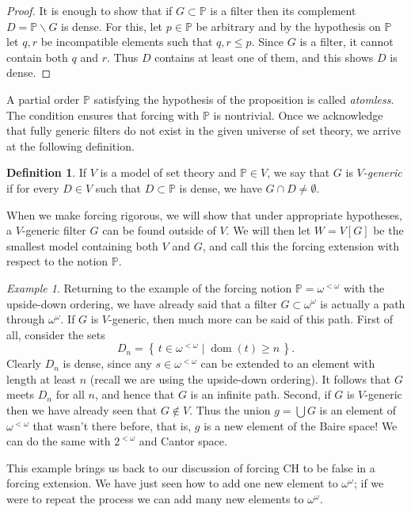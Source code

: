 \documentclass[11pt,oneside]{amsbook}
\newcommand{\set}[1]{\left\{\,#1\,\right\}}
\newcommand{\PP}{\mathbb P}
\DeclareMathOperator{\dom}{dom}
\theoremstyle{definition}
\theoremstyle{plain}
\theoremstyle{definition}
\newtheorem{defn}[thm]{Definition}
\theoremstyle{remark}
\newtheorem{example}[thm]{Example}
\numberwithin{equation}{section}
\numberwithin{figure}{section}
\begin{document}
\begin{proof}
  It is enough to show that if $G\subset\PP$ is a filter then its complement $D=\PP\smallsetminus G$ is dense. For this, let $p\in\PP$ be arbitrary and by the hypothesis on $\PP$ let $q,r$ be incompatible elements such that $q,r\leq p$. Since $G$ is a filter, it cannot contain both $q$ and $r$. Thus $D$ contains at least one of them, and this shows $D$ is dense.
\end{proof}

A partial order $\PP$ satisfying the hypothesis of the proposition is called \emph{atomless}. The condition ensures that forcing with $\PP$ is nontrivial. Once we acknowledge that fully generic filters do not exist in the given universe of set theory, we arrive at the following definition.

\begin{defn}
  If $V$ is a model of set theory and $\PP\in V$, we say that $G$ is \emph{$V$-generic} if for every $D\in V$ such that $D\subset\PP$ is dense, we have $G\cap D\neq\emptyset$.
\end{defn}

When we make forcing rigorous, we will show that under appropriate hypotheses, a $V$-generic filter $G$ can be found outside of $V$. We will then let $W=V[G]$ be the smallest model containing both $V$ and $G$, and call this the forcing extension with respect to the notion $\PP$.

\begin{example}
  Returning to the example of the forcing notion $\PP=\omega^{<\omega}$ with the upside-down ordering, we have already said that a filter $G\subset\omega^\omega$ is actually a path through $\omega^\omega$. If $G$ is $V$-generic, then much more can be said of this path. First of all, consider the sets
  \[D_n=\set{t\in\omega^{<\omega}\mid \dom(t)\geq n}\text{.}
  \]
  Clearly $D_n$ is dense, since any $s\in\omega^{<\omega}$ can be extended to an element with length at least $n$ (recall we are using the upside-down ordering). It follows that $G$ meets $D_n$ for all $n$, and hence that $G$ is an infinite path. Second, if $G$ is $V$-generic then we have already seen that $G\notin V$. Thus the union $g=\bigcup G$ is an element of $\omega^{<\omega}$ that wasn't there before, that is, $g$ is a new element of the Baire space! We can do the same with $2^{<\omega}$ and Cantor space.
\end{example}

This example brings us back to our discussion of forcing CH to be false in a forcing extension. We have just seen how to add one new element to $\omega^\omega$; if we were to repeat the process we can add many new elements to $\omega^\omega$.
\end{document}
